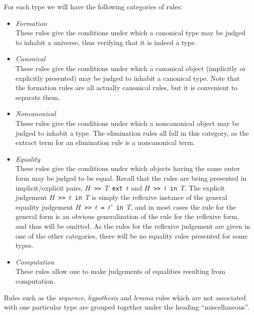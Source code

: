 For each type we will have the following
categories of rules:
\begin{itemize}
\item{\em Formation}\\
These rules give the conditions under which a canonical type may be judged to
inhabit a universe, thus verifying that it is indeed a type.
\item{\em Canonical}\\
These rules give the conditions under which a canonical object
(implicitly or explicitly presented)
may be judged to inhabit a canonical type.
Note that the formation rules are all actually canonical rules, but it is
convenient to separate them.
\item{\em Noncanonical}\\
These rules give the conditions under which a noncanonical object may be
judged to inhabit a type.  The elimination rules all fall in this category,
as the extract term for an elimination rule is a noncanonical term.
\item{\em Equality}\\
These rules give the conditions under which objects having the same outer
form may be judged to be equal.
Recall that the rules are being presented in implicit/explicit pairs,
\mbox{\tt $H$ >> $T$ ext $t$} and \mbox{\tt $H$ >> $t$ in $T$}.
The explicit judgement \mbox{\tt $H$ >> $t$ in $T$} is simply
the reflexive instance of the general equality judgement
\mbox{\tt $H$ >> $t$ = $t'$ in $T$}, and in most cases the rule for the
general form is an obvious generalization of the rule for the reflexive
form, and thus will be omitted.  
As the rules for the reflexive judgement are given in one of the other
categories, there will be no equality rules presented for some types.
\item{\em Computation}\\
These rules allow one to make judgements of equalities resulting from
computation.
\end{itemize}

Rules such as the {\em sequence}, {\em hypothesis} and {\em lemma} rules
which are not associated with one particular type are grouped together under
the heading ``miscellaneous''.

